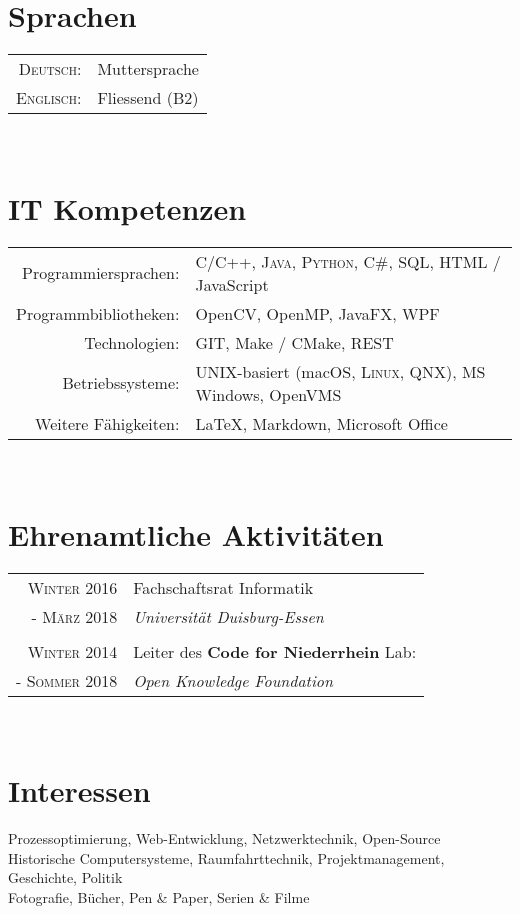 \documentclass[10pt,a4paper]{article}
\begin{document}
\section{Sprachen}

\begin{tabular}{rl}
	\textsc{Deutsch:}		& Muttersprache \\
	\textsc{Englisch:}		& Fliessend (B2) \\
\end{tabular} \\


\section{IT Kompetenzen}

\begin{tabular}{rl}
	Programmiersprachen:	& \textsc{C/C++}, \textsc{Java}, \textsc{Python}, C\#, SQL, HTML / JavaScript \\
	Programmbibliotheken:	& OpenCV, OpenMP, JavaFX, WPF \\
	Technologien:			& GIT, Make / CMake, REST \\
	Betriebssysteme:		& UNIX-basiert (macOS, \textsc{Linux}, \textsc{QNX}), MS Windows, OpenVMS \\
	Weitere F\"ahigkeiten:	& {\fb \LaTeX}\setmainfont[SmallCapsFont=Fontin-SmallCaps.otf]{Fontin.otf}, Markdown, Microsoft Office \\
\end{tabular} \\


\section{Ehrenamtliche Aktivit\"aten}

\begin{tabular}{rl}
	\textsc{Winter} 2016		& Fachschaftsrat Informatik \\
	- \textsc{M\"arz} 2018	& \emph{Universit\"at Duisburg-Essen} \\
	& \\
	
	\textsc{Winter} 2014		& Leiter des \textbf{Code for Niederrhein} Lab: \\
	- \textsc{Sommer} 2018	& \emph{Open Knowledge Foundation} \\
\end{tabular} \\


\section{Interessen}
Prozessoptimierung, Web-Entwicklung, Netzwerktechnik, Open-Source \\
Historische Computersysteme, Raumfahrttechnik, Projektmanagement, Geschichte, Politik \\
Fotografie, B\"ucher, Pen \& Paper, Serien \& Filme
\end{document}
